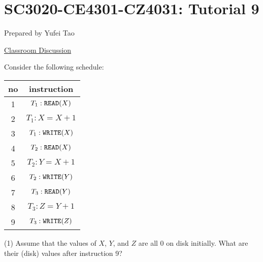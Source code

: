 


\usepackage{amsfonts, amsmath, amssymb, amsthm}
\usepackage{comment}
\usepackage{graphicx}
\usepackage{ifthen}
\usepackage{latexsym}
\usepackage[normalem]{ulem}



\def\extraspacing{\vspace{5mm} \noindent}

\def\best{\mathit{best}}
\def\size{\mathit{size}}




\section*{SC3020-CE4301-CZ4031: Tutorial 9}
Prepared by Yufei Tao \\

\begin{center}
    \uline{Classroom Discussion}
\end{center}

\extraspacing {\bf Problem 1.} Consider the following schedule:

\begin{center}
    \begin{tabular}{c|c}
        no & instruction \\
        \hline
        1 & $T_1: \texttt{READ}(X)$ \\
        2 & $T_1: X = X + 1$ \\
        3 & $T_1: \texttt{WRITE}(X)$ \\
        4 & $T_2: \texttt{READ}(X)$ \\
        5 & $T_2: Y = X + 1$ \\
        6 & $T_2: \texttt{WRITE}(Y)$ \\
        7 & $T_3: \texttt{READ}(Y)$ \\
        8 & $T_3: Z = Y + 1$ \\
        9 & $T_3: \texttt{WRITE}(Z)$
    \end{tabular}
\end{center}

(1) Assume that the values of $X$, $Y$, and $Z$ are all 0 on disk initially. What are their (disk) values after instruction 9?

